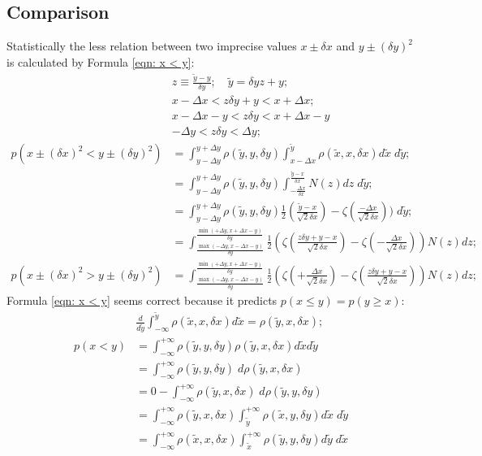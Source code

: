 \documentclass[twoside]{article}
\numberwithin{equation}{section}
\begin{document}
\subsection{Comparison}

Statistically the less relation between two imprecise values $x \pm \delta x$ and $y \pm (\delta y)^2$ is calculated by Formula \ref{eqn: x < y}:
\begin{align}
& z \equiv \frac{\tilde{y} - y}{\delta y}; \quad \tilde{y} = \delta y z + y; \\
& x - \Delta x < z \delta y + y < x + \Delta x; \\ & x - \Delta x - y < z \delta y < x + \Delta x - y \\
& - \Delta y < z \delta y < \Delta y; \\
p\left( x \pm (\delta x)^2 < y \pm (\delta y)^2 \right) & = 
  \int_{y - \Delta y}^{y + \Delta y} \rho(\tilde{y}, y, \delta y) 
    \int_{x - \Delta x}^{\tilde{y}} \rho(\tilde{x}, x, \delta x) d \tilde{x} \;d \tilde{y}; \\
& = \int_{y - \Delta y}^{y + \Delta y} \rho(\tilde{y}, y, \delta y) 
  \int_{-\frac{\Delta x}{\delta x}}^{\frac{\tilde{y} - x}{\delta x}} N(z) d z \;d \tilde{y}; \\
& = \int_{y - \Delta y}^{y + \Delta y} \rho(\tilde{y}, y, \delta y) 
      \frac{1}{2}(\frac{\tilde{y} - x}{\sqrt{2} \delta x}) - \zeta(\frac{-\Delta x}{\sqrt{2} \delta x})) \;d \tilde{y}; \\
& = \int_{\frac{\max(-\Delta y, x - \Delta x - y)}{\delta y}}^{\frac{\min(+\Delta y, x + \Delta x - y)}{\delta y}} 
      \frac{1}{2} \left(\zeta(\frac{z \delta y + y - x}{\sqrt{2} \delta x}) - \zeta(-\frac{\Delta x}{\sqrt{2} \delta x})\right) N(z) d z; \\
p\left( x \pm (\delta x)^2 > y \pm (\delta y)^2 \right) & =     
   \int_{\frac{\max(-\Delta y, x - \Delta x - y)}{\delta y}}^{\frac{\min(+\Delta y, x + \Delta x - y)}{\delta y}} 
      \frac{1}{2} \left(\zeta(+\frac{\Delta x}{\sqrt{2} \delta x}) - \zeta(\frac{z \delta y + y - x}{\sqrt{2} \delta x})\right) N(z) d z;
\end{align}
Formula \eqref{eqn: x < y} seems correct because it predicts $p(x \le y) = p(y \ge x)$:
\begin{align}
& \frac{d}{d \tilde{y}} \int_{-\infty}^{\tilde{y}} \rho(\tilde{x}, x, \delta x) d \tilde{x} = \rho(\tilde{y}, x, \delta x); \\
p(x< y) & = \int_{-\infty}^{+\infty} \rho(\tilde{y}, y, \delta y) \rho(\tilde{y}, x, \delta x) d \tilde{x} d \tilde{y} \\
& = \int_{-\infty}^{+\infty} \rho(\tilde{y}, y, \delta y) \;d \rho(\tilde{y}, x, \delta x) \\
& = 0 - \int_{-\infty}^{+\infty} \rho(\tilde{y}, x, \delta x) \;d \rho(\tilde{y}, y, \delta y) \\
& = \int_{-\infty}^{+\infty} \rho(\tilde{y}, x, \delta x) 
\int_{\tilde{y}}^{+\infty} \rho(\tilde{x}, y, \delta y) 
d \tilde{x} \;d \tilde{y} \\
& = \int_{-\infty}^{+\infty} \rho(\tilde{x}, x, \delta x) 
\int_{\tilde{x}}^{+\infty} \rho(\tilde{y}, y, \delta y) 
d \tilde{y} \;d \tilde{x}
\end{align}
\end{document}
